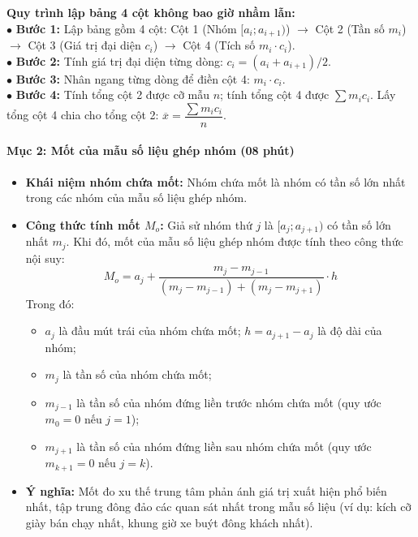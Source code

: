 \documentclass[12pt, a4paper]{article}
\begin{document}
\begin{scaffoldbox}
    \textbf{Quy trình lập bảng 4 cột không bao giờ nhầm lẫn:}\\
    $\bullet$ \textbf{Bước 1:} Lập bảng gồm 4 cột: Cột 1 (Nhóm $[a_i; a_{i+1})$) $\to$ Cột 2 (Tần số $m_i$) $\to$ Cột 3 (Giá trị đại diện $c_i$) $\to$ Cột 4 (Tích số $m_i \cdot c_i$).\\
    $\bullet$ \textbf{Bước 2:} Tính giá trị đại diện từng dòng: $c_i = (a_i + a_{i+1})/2$.\\
    $\bullet$ \textbf{Bước 3:} Nhân ngang từng dòng để điền cột 4: $m_i \cdot c_i$.\\
    $\bullet$ \textbf{Bước 4:} Tính tổng cột 2 được cỡ mẫu $n$; tính tổng cột 4 được $\sum m_i c_i$. Lấy tổng cột 4 chia cho tổng cột 2: $\overline{x} = \dfrac{\sum m_i c_i}{n}$.
\end{scaffoldbox}

\paragraph{Mục 2: Mốt của mẫu số liệu ghép nhóm (08 phút)}
\begin{itemize}
    \item \textbf{Khái niệm nhóm chứa mốt:} Nhóm chứa mốt là nhóm có tần số lớn nhất trong các nhóm của mẫu số liệu ghép nhóm.
    \item \textbf{Công thức tính mốt $M_o$:} Giả sử nhóm thứ $j$ là $[a_j; a_{j+1})$ có tần số lớn nhất $m_j$. Khi đó, mốt của mẫu số liệu ghép nhóm được tính theo công thức nội suy:
    $$M_o = a_j + \dfrac{m_j - m_{j-1}}{(m_j - m_{j-1}) + (m_j - m_{j+1})} \cdot h$$
    Trong đó:
    \begin{itemize}
        \item $a_j$ là đầu mút trái của nhóm chứa mốt; $h = a_{j+1} - a_j$ là độ dài của nhóm;
        \item $m_j$ là tần số của nhóm chứa mốt;
        \item $m_{j-1}$ là tần số của nhóm đứng liền trước nhóm chứa mốt (quy ước $m_0 = 0$ nếu $j = 1$);
        \item $m_{j+1}$ là tần số của nhóm đứng liền sau nhóm chứa mốt (quy ước $m_{k+1} = 0$ nếu $j = k$).
    \end{itemize}
    \item \textbf{Ý nghĩa:} Mốt đo xu thế trung tâm phản ánh giá trị xuất hiện phổ biến nhất, tập trung đông đảo các quan sát nhất trong mẫu số liệu (ví dụ: kích cỡ giày bán chạy nhất, khung giờ xe buýt đông khách nhất).
\end{itemize}
\end{document}
